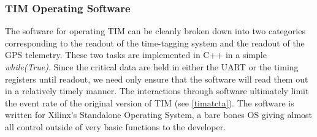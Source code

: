 \subsubsection{TIM Operating Software}%
\label{opsoft}
The software for operating TIM can be cleanly broken down into two categories corresponding to the readout of the time-tagging system and the readout of the GPS telemetry. These two tasks are implemented in C++ in a simple \textit{while(True)}. Since the critical data are held in either the UART or the timing registers until readout, we need only ensure that the software will read them out in a relatively timely manner. The interactions through software ultimately limit the event rate of the original version of TIM (see \autoref{timatcta}). The software is written for Xilinx's Standalone Operating System, a bare bones OS giving almost all control outside of very basic functions to the developer.

